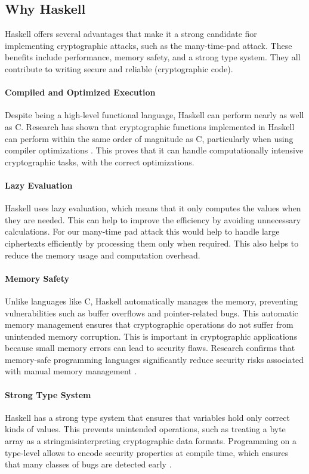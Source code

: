 \subsection{Why Haskell}
\label{sec:why_haskell}
Haskell offers several advantages that make it a strong candidate fior implementing cryptographic attacks, such as the many-time-pad attack. These benefits include performance, memory safety, and a strong type system. They all contribute to writing secure and reliable (cryptographic code). 

\paragraph{Compiled and Optimized Execution} Despite being a high-level functional language, Haskell can perform nearly as well as C. Research has shown that cryptographic functions implemented in Haskell can perform within the same order of magnitude as C, particularly when using compiler optimizations \cite{Ankner2013}. This proves that it can handle computationally intensive cryptographic tasks, with the correct optimizations.

\paragraph{Lazy Evaluation} Haskell uses lazy evaluation, which means that it only computes the values when they are needed. This can help to improve the efficiency by avoiding unnecessary calculations. For our many-time pad attack this would help to handle large ciphertexts efficiently by processing them only when required. This also helps to reduce the memory usage and computation overhead.

\paragraph{Memory Safety}
Unlike languages like C, Haskell automatically manages the memory, preventing vulnerabilities such as buffer overflows and pointer-related bugs. This automatic memory management ensures that cryptographic operations do not suffer from unintended memory corruption. This is important in cryptographic applications because small memory errors can lead to security flaws. Research confirms that memory-safe programming languages significantly reduce security risks associated with manual memory management \cite{Dwivedi2021}. 

\paragraph{Strong Type System}
Haskell has a strong type system that ensures that variables hold only correct kinds of values. This prevents unintended operations, such as treating a byte array as a stringmisinterpreting cryptographic data formats. Programming on a type-level allows to encode security properties at compile time, which ensures that many classes of bugs are detected early \cite{Barbosa2011}.

